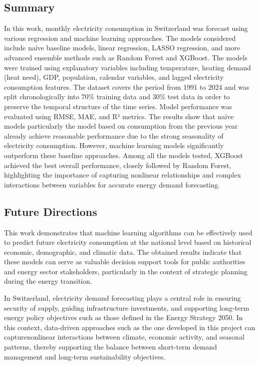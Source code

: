 \documentclass[11pt,a4paper]{article}
\begin{document}
\subsection{Summary}
In this work, monthly electricity consumption in Switzerland was forecast using various regression and machine learning approaches. The models considered include naïve baseline models, linear regression, LASSO regression, and more advanced ensemble methods such as Random Forest and XGBoost. The models were trained using explanatory variables including temperature, heating demand (heat need), GDP, population, calendar variables, and lagged electricity consumption features. The dataset covers the period from 1991 to 2024 and was split chronologically into 70\% training data and 30\% test data in order to preserve the temporal structure of the time series. Model performance was evaluated using RMSE, MAE, and R² metrics. The results show that naïve models particularly the model based on consumption from the previous year already achieve reasonable performance due to the strong seasonality of electricity consumption. However, machine learning models significantly outperform these baseline approaches. Among all the models tested, XGBoost achieved the best overall performance, closely followed by Random Forest, highlighting the importance of capturing nonlinear relationships and complex interactions between variables for accurate energy demand forecasting.

\subsection{Future Directions}

This work demonstrates that machine learning algorithms can be effectively used to predict future electricity consumption at the national level based on historical economic, demographic, and climatic data. The obtained results indicate that these models can serve as valuable decision support tools for public authorities and energy sector stakeholders, particularly in the context of strategic planning during the energy transition. 

In Switzerland, electricity demand forecasting plays a central role in ensuring security of supply, guiding infrastructure investments, and supporting long-term energy policy objectives such as those defined in the Energy Strategy 2050. In this context, data-driven approaches such as the one developed in this project can capturenonlinear interactions between climate, economic activity, and seasonal patterns, thereby supporting the balance between short-term demand management and long-term sustainability objectives.
\end{document}
